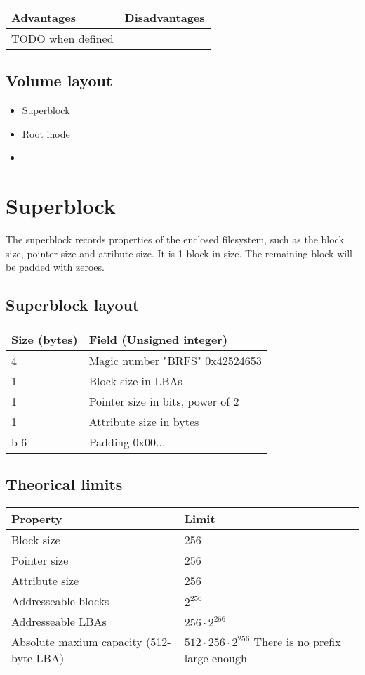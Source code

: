 \documentclass[]{article}
\begin{document}
	\begin{tabularx}{\textwidth}{X|X}
		\textbf{Advantages} & \textbf{Disadvantages} \\
		\hline
		TODO when defined
	\end{tabularx}

	\subsection{Volume layout}
	
	\begin{itemize}
		\item Superblock
		\item Root inode
		\item <other inodes>
	\end{itemize}

	\section{Superblock}
	
	The superblock records properties of the enclosed filesystem, such as the block size, pointer size and atribute size. It is 1 block in size. The remaining block will be padded with zeroes.
	
	\subsection{Superblock layout}
	
	\begin{tabular}{|l|l|} 
		\hline
		\textbf{Size (bytes)} & \textbf{Field (Unsigned integer)} \\ [0.5ex] 
		\hline
		4 & Magic number "BRFS" 0x42524653  \\ 
		\hline
		1 & Block size in LBAs \\
		\hline
		1 & Pointer size in bits, power of 2 \\
		\hline
		1 & Attribute size in bytes \\
		\hline
		b-6 & Padding 0x00... \\
		\hline	
	\end{tabular}

	\subsection{Theorical limits}
	
	\begin{tabular}{|l|l|} 
		\hline
		\textbf{Property} & \textbf{Limit} \\ [0.5ex] 
		\hline
		Block size & 256 \\ 
		\hline
		Pointer size & 256 \\
		\hline
		Attribute size & 256 \\
		\hline
		Addresseable blocks & $2^{256}$ \\
		\hline	
		Addresseable LBAs & $256 \cdot 2^{256}$ \\
		\hline
		Absolute maxium capacity (512-byte LBA) & $512 \cdot 256 \cdot 2^{256}$ There is no prefix large enough \\
		\hline
	\end{tabular}\\
\end{document}
